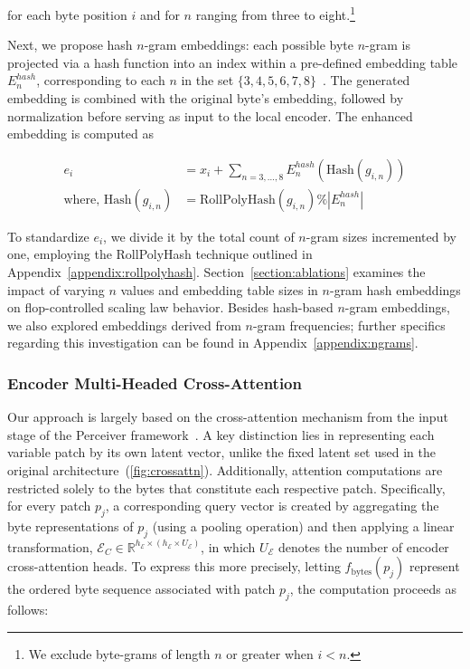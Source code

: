 for each byte position $i$ and for $n$ ranging from three to eight.\footnote{
We exclude byte-grams of length $n$ or greater when $i < n$. }

Next, we propose hash $n$-gram embeddings: each possible byte $n$-gram is projected via a hash function into an index within a pre-defined embedding table $E_{n}^{hash}$, corresponding to each $n$ in the set $\{3,4,5,6,7,8\}$~\citep{bai2010learning}. The generated embedding is combined with the original byte's embedding, followed by normalization before serving as input to the local encoder. The enhanced embedding is computed as

\begin{align}
e_i &= x_i + \sum_{n = 3,...,8}E_{n}^{hash}(\text{Hash}(g_{i,n})) \\
\text{where, Hash}(g_{i,n}) &= \text{RollPolyHash}(g_{i,n}) \% |E_{n}^{hash}|
\end{align}

To standardize $e_i$, we divide it by the total count of $n$-gram sizes incremented by one, employing the RollPolyHash technique outlined in Appendix~\ref{appendix:rollpolyhash}. Section~\ref{section:ablations} examines the impact of varying $n$ values and embedding table sizes in $n$-gram hash embeddings on flop-controlled scaling law behavior. Besides hash-based $n$-gram embeddings, we also explored embeddings derived from $n$-gram frequencies; further specifics regarding this investigation can be found in Appendix~\ref{appendix:ngrams}.

\subsubsection{Encoder Multi-Headed Cross-Attention}
\label{sec:enc-cross-attn}
Our approach is largely based on the cross-attention mechanism from the input stage of the Perceiver framework~\citep{jaegle2021perceiver}. A key distinction lies in representing each variable patch by its own latent vector, unlike the fixed latent set used in the original architecture~(\autoref{fig:crossattn}). Additionally, attention computations are restricted solely to the bytes that constitute each respective patch. Specifically, for every patch $p_j$, a corresponding query vector is created by aggregating the byte representations of $p_j$ (using a pooling operation) and then applying a linear transformation, $\mathcal{E}_{C} \in \mathbb{R}^{h_{\mathcal{E}} \times (h_{\mathcal{E}} \times U_{\mathcal{E}})}$, in which $U_{\mathcal{E}}$ denotes the number of encoder cross-attention heads. To express this more precisely, letting $f_{\text{bytes}}(p_j)$ represent the ordered byte sequence associated with patch $p_j$, the computation proceeds as follows:

